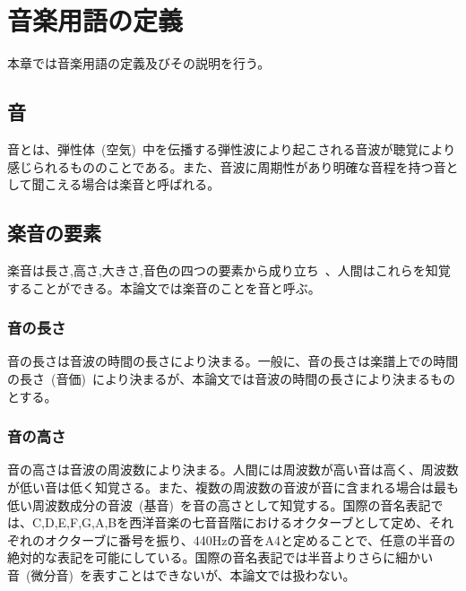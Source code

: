 \chapter{音楽用語の定義}

本章では音楽用語の定義及びその説明を行う。

\section{音}

音とは、弾性体~(空気)~中を伝播する弾性波により起こされる音波が聴覚により感じられるもののことである。また、音波に周期性があり明確な音程を持つ音として聞こえる場合は楽音と呼ばれる。

\section{楽音の要素}

楽音は長さ,高さ,大きさ,音色の四つの要素から成り立ち~\cite{音楽の基礎}、人間はこれらを知覚することができる。本論文では楽音のことを音と呼ぶ。

\subsection{音の長さ}

音の長さは音波の時間の長さにより決まる。一般に、音の長さは楽譜上での時間の長さ~(音価)~により決まるが、本論文では音波の時間の長さにより決まるものとする。

\subsection{音の高さ}

音の高さは音波の周波数により決まる。人間には周波数が高い音は高く、周波数が低い音は低く知覚さる。また、複数の周波数の音波が音に含まれる場合は最も低い周波数成分の音波~(基音)~を音の高さとして知覚する。国際の音名表記では、C,D,E,F,G,A,Bを西洋音楽の七音音階におけるオクターブとして定め、それぞれのオクターブに番号を振り、440Hzの音をA4と定めることで、任意の半音の絶対的な表記を可能にしている。国際の音名表記では半音よりさらに細かい音~(微分音)~を表すことはできないが、本論文では扱わない。

